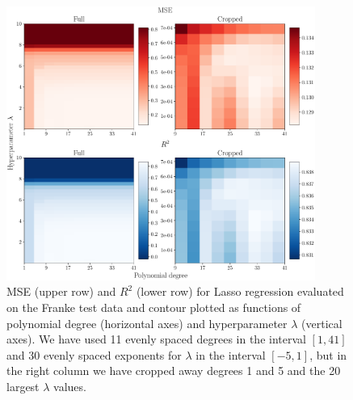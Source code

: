 \documentclass[aps,pra,english,notitlepage,reprint,nofootinbib]{revtex4-1}  %
\begin{document}
\begin{figure}
  \vspace*{-5pt}
  \centering %
  \includegraphics[width=0.9\textwidth]{../figs/c_MSE_R2.pdf}
  \caption{MSE (upper row) and $R^2$ (lower row) for Lasso regression evaluated on the Franke test data and contour plotted as functions of polynomial degree (horizontal axes) and hyperparameter $\lambda$ (vertical axes). We have used 11 evenly spaced degrees in the interval $[1, 41]$ and 30 evenly spaced exponents for $\lambda$ in the interval $[-5,1]$, but in the right column we have cropped away degrees 1 and 5 and the 20 largest $\lambda$ values.}\label{fig:c MSE R2}
  \vspace*{-5pt}
\end{figure}
\end{document}
